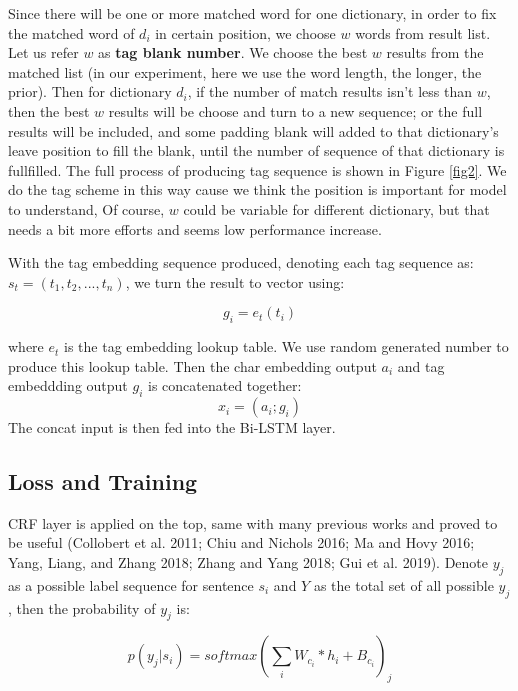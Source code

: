 \documentclass[letterpaper]{article} %
\begin{document}
Since there will be one or more matched word for one dictionary, in order to fix the matched word of $d_i$ in certain position, we choose $w$ words from result list. Let us refer $w$ as \textbf{tag blank number}. We choose the best $w$ results from the matched list (in our experiment, here we use the word length, the longer, the prior). Then for dictionary $d_i$, if the number of match results isn't less than $w$, then the best $w$ results will be choose and turn to a new sequence; or the full results will be included, and some padding blank will added to that dictionary's leave position to fill the blank, until the number of sequence of that dictionary is fullfilled.  The full process of producing tag sequence is shown in Figure \ref{fig2}. We do the tag scheme in this way cause we think the position is important for model to understand, Of course, $w$ could be variable for different dictionary, but that needs a bit more efforts and seems low performance increase.

With the tag embedding sequence produced, denoting each tag sequence as: $s_t = (t_1, t_2, ..., t_n)$, we turn the result to vector using: 

\begin{equation}
g_i = e_t(t_i) \label{tag_embedding}
\end{equation}

where $e_t$ is the tag embedding lookup table. We use random generated number to produce this lookup table. Then the char embedding output $a_i$ and tag embeddding output $g_i$ is concatenated together:
\begin{equation}
x_i = (a_i;g_i) \label{concat}
\end{equation}
The concat input is then fed into the Bi-LSTM layer.  

\subsection{Loss and Training}

CRF layer is applied on the top, same with many previous works and proved to be useful (Collobert et al. 2011; Chiu and Nichols 2016; Ma and Hovy 2016; Yang, Liang, and Zhang 2018; Zhang and Yang 2018; Gui et al. 2019). Denote $y_j$ as a possible label sequence for sentence $s_i$ and $Y$ as the total set of all possible $y_j$, then the probability of $y_j$ is:

\begin{equation}
p(y_j | s_i) = softmax(\sum_i{W_{c_i} * h_i} + B_{c_i})_j
\label{crf_probability}
\end{equation}
\end{document}
